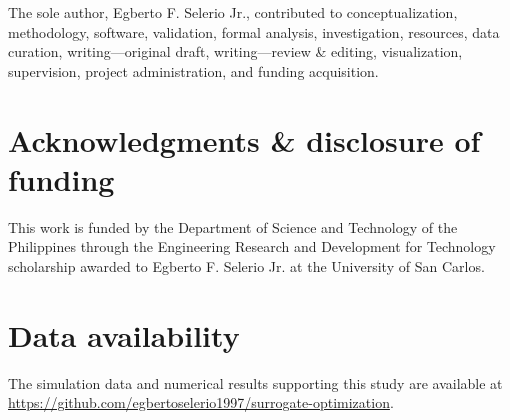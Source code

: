 \documentclass[a4paper,fleqn]{cas-sc}
\begin{document}
The sole author, Egberto F. Selerio Jr., contributed to conceptualization, methodology, software, validation, formal analysis, investigation, resources, data curation, writing---original draft, writing---review \& editing, visualization, supervision, project administration, and funding acquisition.

\section*{Acknowledgments \& disclosure of funding}

This work is funded by the Department of Science and Technology of the Philippines through the Engineering Research and Development for Technology scholarship awarded to Egberto F. Selerio Jr. at the University of San Carlos.

\section*{Data availability}

The simulation data and numerical results supporting this study are available at \url{https://github.com/egbertoselerio1997/surrogate-optimization}.
\end{document}
